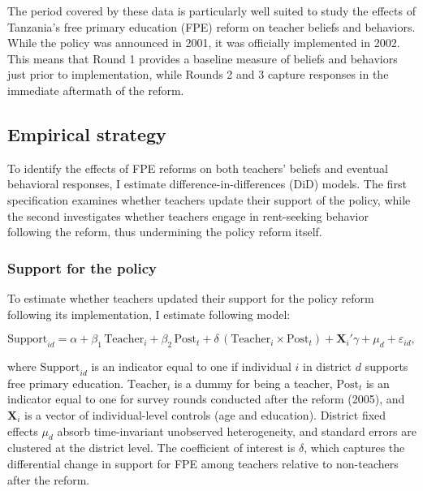 \documentclass[hidelinks,12pt]{article}
\begin{document}
\begin{singlespace}
The period covered by these data is particularly well suited to study the effects of Tanzania's free primary education (FPE) reform on teacher beliefs and behaviors. While the policy was announced in 2001, it was officially implemented in 2002. This means that Round 1 provides a baseline measure of beliefs and behaviors just prior to implementation, while Rounds 2 and 3 capture responses in the immediate aftermath of the reform. 

\subsection{Empirical strategy}
To identify the effects of FPE reforms on both teachers’ beliefs and eventual behavioral responses, I estimate difference-in-differences (DiD) models. The first specification examines whether teachers update their support of the policy, while the second investigates whether teachers engage in rent-seeking behavior following the reform, thus undermining the policy reform itself.  

\subsubsection{Support for the policy}
To estimate whether teachers updated their support for the policy reform following its implementation, I estimate following model:  
\vspace{-1em}

\begin{equation}
    \label{eq:beliefs}
    \text{Support}_{id} = \alpha + \beta_1 \, \text{Teacher}_{i} 
    + \beta_2 \, \text{Post}_{t} 
    + \delta \, (\text{Teacher}_{i} \times \text{Post}_{t})
    + \mathbf{X}_{i}' \gamma 
    + \mu_{d} + \varepsilon_{id},
\end{equation}

where $\text{Support}_{id}$ is an indicator equal to one if individual $i$ in district $d$ supports free primary education. $\text{Teacher}_{i}$ is a dummy for being a teacher, $\text{Post}_{t}$ is an indicator equal to one for survey rounds conducted after the reform (2005), and $\mathbf{X}_{i}$ is a vector of individual-level controls (age and education). District fixed effects $\mu_{d}$ absorb time-invariant unobserved heterogeneity, and standard errors are clustered at the district level. The coefficient of interest is $\delta$, which captures the differential change in support for FPE among teachers relative to non-teachers after the reform.  


\end{singlespace}
\end{document}
